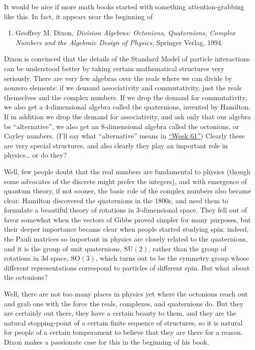 \documentclass{article}
\def\tightlist{}
\begin{document}
It would be nice if more math books started with something
attention-grabbing like this. In fact, it appears near the beginning of

\begin{enumerate}
\def\labelenumi{\arabic{enumi})}
\tightlist
\item
  Geoffrey M. Dixon, \emph{Division Algebras: Octonions, Quaternions,
  Complex Numbers and the Algebraic Design of Physics}, Springer Verlag,
  1994.
\end{enumerate}

Dixon is convinced that the details of the Standard Model of particle
interactions can be understood better by taking certain mathematical
structures very seriously. There are very few algebras over the reals
where we can divide by nonzero elements: if we demand associativity and
commutativity, just the reals themselves and the complex numbers. If we
drop the demand for commutativity, we also get a \(4\)-dimensional
algebra called the quaternions, invented by Hamilton. If in addition we
drop the demand for associativity, and ask only that our algebra be
``alternative'', we also get an \(8\)-dimensional algebra called the
octonions, or Cayley numbers. (I'll say what ``alternative'' means in
\protect\hyperlink{week61}{``Week 61''}) Clearly these are very special
structures, and also clearly they play an important role in
physics\ldots{} or do they?

Well, few people doubt that the real numbers are fundamental to physics
(though some advocates of the discrete might prefer the integers), and
with emergence of quantum theory, if not sooner, the basic role of the
complex numbers also became clear. Hamilton discovered the quaternions
in the 1800s, and used them to formulate a beautiful theory of rotations
in \(3\)-dimensional space. They fell out of favor somewhat when the
vectors of Gibbs proved simpler for many purposes, but their deeper
importance became clear when people started studying spin: indeed, the
Pauli matrices so important in physics are closely related to the
quaternions, and it is the group of unit quaternions,
\(\mathrm{SU}(2)\), rather than the group of rotations in 3d space,
\(\mathrm{SO}(3)\), which turns out to be the symmetry group whose
different representations correspond to particles of different spin. But
what about the octonions?

Well, there are not too many places in physics yet where the octonions
reach out and grab one with the force the reals, complexes, and
quaternions do. But they are certainly out there, they have a certain
beauty to them, and they are the natural stopping-point of a certain
finite sequence of structures, so it is natural for people of a certain
temperament to believe that they are there for a reason. Dixon makes a
passionate case for this in the beginning of his book.
\end{document}
